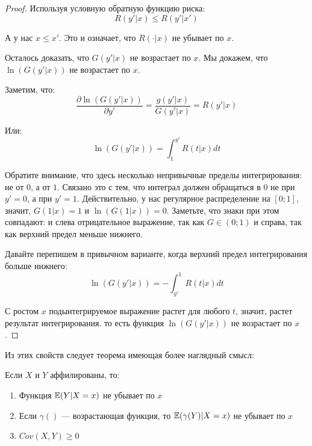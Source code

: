 \begin{proof}
Используя условную обратную функцию риска:
\begin{equation}
R(y'|x)\leq R(y'|x')
\end{equation}

А у нас $ x\leq x' $. Это и означает, что $ R(\cdot|x) $ не убывает по $ x $.

Осталось доказать, что $ G(y'|x) $ не возрастает по $ x $. Мы докажем, что $ \ln (G(y'|x)) $ не возрастает по $ x $.

Заметим, что:
\begin{equation}
\frac{\partial \ln (G(y'|x))}{\partial y'}=\frac{g(y'|x)}{G(y'|x)}=R(y'|x)
\end{equation}

Или:
\begin{equation}
\ln(G(y'|x))=\int_{1}^{y'}R(t|x)dt
\end{equation}

Обратите внимание, что здесь несколько непривычные пределы интегрирования: не от $0$, а от $ 1 $. Связано это с тем, что интеграл должен обращаться в 0 не при $ y'=0 $, а при $ y'=1 $. Действительно, у нас регулярное распределение на $ [0;1] $, значит, $ G(1|x)=1 $ и $ \ln (G(1|x))=0 $. Заметьте, что знаки при этом совпадают: и слева отрицательное выражение, так как $ G\in (0;1) $ и справа, так как верхний предел меньше нижнего.

Давайте перепишем в привычном варианте, когда верхний предел интегрирования больше нижнего:
\begin{equation}
\ln(G(y'|x))=-\int_{y'}^{1}R(t|x)dt
\end{equation}

С ростом $ x $ подынтегрируемое выражение растет для любого $ t $, значит, растет результат интегрирования. то есть функция $\ln( G(y'|x) )$ не возрастает по $ x $.

\end{proof}









Из этих свойств следует теорема имеющая более наглядный смысл:
\begin{myth} \label{prop_affiliated}
Если $ X $ и $ Y $ аффилированы, то:
\begin{enumerate}
\item Функция $ \mathbb{E}(Y|X=x )$ не убывает по $ x $
\item Если $ \gamma() $ — возрастающая функция, то $ \mathbb{E}(\gamma(Y)|X=x) $ не убывает по $ x $
\item $ Cov(X,Y)\geq 0 $
\end{enumerate}
\end{myth}





